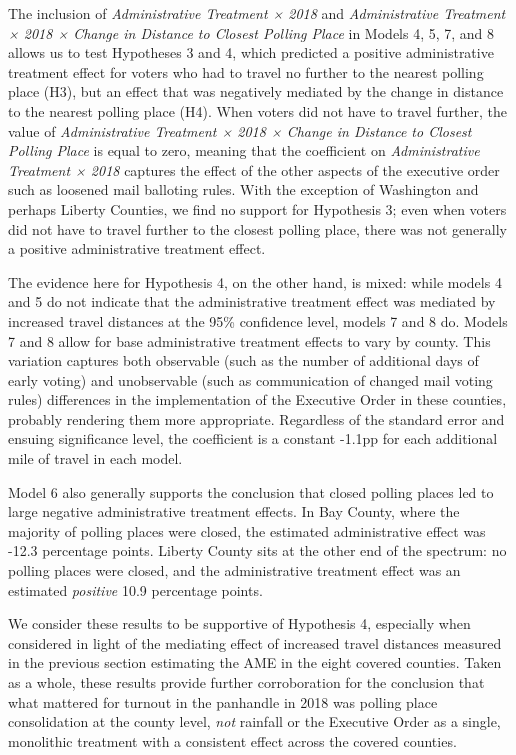 \documentclass[
  12pt,
]{article}
\begin{document}
The inclusion of \emph{Administrative Treatment × 2018} and \emph{Administrative Treatment × 2018 × Change in Distance to Closest Polling Place} in Models 4, 5, 7, and 8 allows us to test Hypotheses 3 and 4, which predicted a positive administrative treatment effect for voters who had to travel no further to the nearest polling place (H3), but an effect that was negatively mediated by the change in distance to the nearest polling place (H4). When voters did not have to travel further, the value of \emph{Administrative Treatment × 2018 × Change in Distance to Closest Polling Place} is equal to zero, meaning that the coefficient on \emph{Administrative Treatment × 2018} captures the effect of the other aspects of the executive order such as loosened mail balloting rules. With the exception of Washington and perhaps Liberty Counties, we find no support for Hypothesis 3; even when voters did not have to travel further to the closest polling place, there was not generally a positive administrative treatment effect.

The evidence here for Hypothesis 4, on the other hand, is mixed: while models 4 and 5 do not indicate that the administrative treatment effect was mediated by increased travel distances at the 95\% confidence level, models 7 and 8 do. Models 7 and 8 allow for base administrative treatment effects to vary by county. This variation captures both observable (such as the number of additional days of early voting) and unobservable (such as communication of changed mail voting rules) differences in the implementation of the Executive Order in these counties, probably rendering them more appropriate. Regardless of the standard error and ensuing significance level, the coefficient is a constant -1.1pp for each additional mile of travel in each model.

Model 6 also generally supports the conclusion that closed polling places led to large negative administrative treatment effects. In Bay County, where the majority of polling places were closed, the estimated administrative effect was -12.3 percentage points. Liberty County sits at the other end of the spectrum: no polling places were closed, and the administrative treatment effect was an estimated \emph{positive} 10.9 percentage points.

We consider these results to be supportive of Hypothesis 4, especially when considered in light of the mediating effect of increased travel distances measured in the previous section estimating the AME in the eight covered counties. Taken as a whole, these results provide further corroboration for the conclusion that what mattered for turnout in the panhandle in 2018 was polling place consolidation at the county level, \emph{not} rainfall or the Executive Order as a single, monolithic treatment with a consistent effect across the covered counties.
\end{document}

